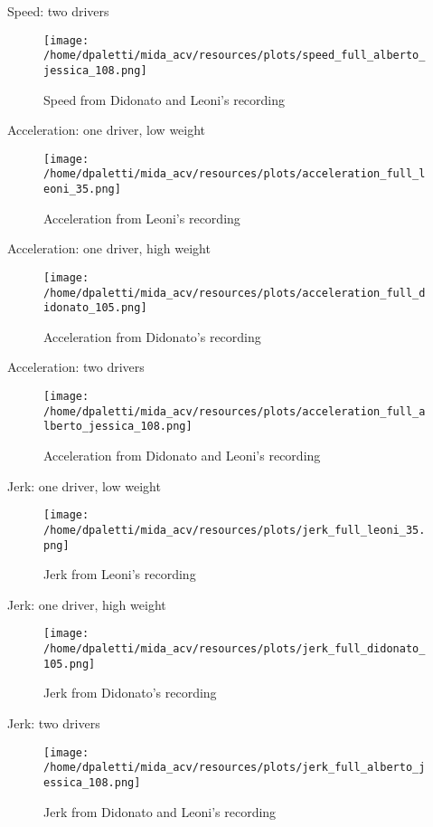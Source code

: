 \documentclass[presentation]{beamer}
\begin{document}
\begin{frame}[label={sec:orgaf0cf35}]{Speed: two drivers}
\begin{figure}[htbp]
\centering
\texttt{[image: /home/dpaletti/mida\_acv/resources/plots/speed\_full\_alberto\_jessica\_108.png]}
\caption{\label{fig:speed_alberto_jessica}Speed from Didonato and Leoni's recording}
\end{figure}
\end{frame}
\begin{frame}[label={sec:org04bd422}]{Acceleration: one driver, low weight}
\begin{figure}[htbp]
\centering
\texttt{[image: /home/dpaletti/mida\_acv/resources/plots/acceleration\_full\_leoni\_35.png]}
\caption{\label{fig:speed_jessica}Acceleration from Leoni's recording}
\end{figure}
\end{frame}
\begin{frame}[label={sec:org5415cc9}]{Acceleration: one driver, high weight}
\begin{figure}[htbp]
\centering
\texttt{[image: /home/dpaletti/mida\_acv/resources/plots/acceleration\_full\_didonato\_105.png]}
\caption{\label{fig:speed_jessica}Acceleration from Didonato's recording}
\end{figure}
\end{frame}
\begin{frame}[label={sec:orgaed43bc}]{Acceleration: two drivers}
\begin{figure}[htbp]
\centering
\texttt{[image: /home/dpaletti/mida\_acv/resources/plots/acceleration\_full\_alberto\_jessica\_108.png]}
\caption{\label{fig:speed_alberto_jessica}Acceleration from Didonato and Leoni's recording}
\end{figure}
\end{frame}

\begin{frame}[label={sec:org9ed5c3f}]{Jerk: one driver, low weight}
\begin{figure}[htbp]
\centering
\texttt{[image: /home/dpaletti/mida\_acv/resources/plots/jerk\_full\_leoni\_35.png]}
\caption{\label{fig:speed_jessica}Jerk from Leoni's recording}
\end{figure}
\end{frame}
\begin{frame}[label={sec:org20782c6}]{Jerk: one driver, high weight}
\begin{figure}[htbp]
\centering
\texttt{[image: /home/dpaletti/mida\_acv/resources/plots/jerk\_full\_didonato\_105.png]}
\caption{\label{fig:speed_jessica}Jerk from Didonato's recording}
\end{figure}
\end{frame}
\begin{frame}[label={sec:org84221ee}]{Jerk: two drivers}
\begin{figure}[htbp]
\centering
\texttt{[image: /home/dpaletti/mida\_acv/resources/plots/jerk\_full\_alberto\_jessica\_108.png]}
\caption{\label{fig:speed_alberto_jessica}Jerk from Didonato and Leoni's recording}
\end{figure}
\end{frame}
\end{document}
